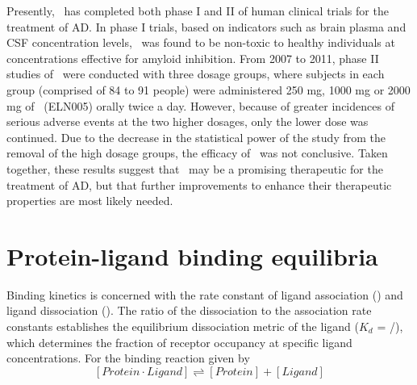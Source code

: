 Presently, \scylloi\ has completed both phase I and II of human clinical trials for the treatment of AD.\cite{Salloway:2011im} In phase I trials, based on indicators such as brain plasma and CSF concentration levels, \scylloi\ was found to be non-toxic to healthy individuals at concentrations effective for amyloid inhibition. From 2007 to 2011, phase II studies of \scylloi\ were conducted with three dosage groups, where subjects in each group (comprised of 84 to 91 people) were administered 250 mg, 1000 mg or 2000 mg of \scylloi\ (ELN005) orally twice a day. However, because of greater incidences of serious adverse events at the two higher dosages, only the lower dose was continued. Due to the decrease in the statistical power of the study from the removal of the high dosage groups, the efficacy of \scylloi\ was not conclusive.\cite{Salloway:2011im} Taken together, these results suggest that \scylloi\ may be a promising therapeutic for the treatment of AD, but that further improvements to enhance their therapeutic properties are most likely needed.\cite{Nitz:2008jl,Sun:2008ko} %

\section{Protein-ligand binding equilibria}

Binding kinetics is concerned with the rate constant of ligand association (\kon) and ligand dissociation (\koff). The ratio of the dissociation to the association rate constants establishes the equilibrium dissociation metric of the ligand ($K_{d}$ = \koff/\kon), which determines the fraction of receptor occupancy at specific ligand concentrations. For the binding reaction given by
\begin{equation}
\left[ Protein\cdot Ligand \right] \rightleftharpoons \left[ Protein \right]+\left[ Ligand \right]
\end{equation}
 
